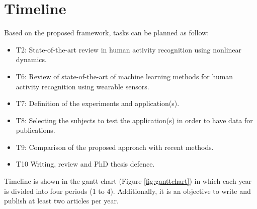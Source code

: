 
\chapter{Timeline}

\ifpdf
    \graphicspath{{Chapter4/Figs/Raster/}{Chapter4/Figs/PDF/}{Chapter4/Figs/}}
\else
    \graphicspath{{Chapter4/Figs/Vector/}{Chapter4/Figs/}}
\fi

Based on the proposed framework, tasks can be planned as follow:
\begin{itemize}[noitemsep,topsep=0pt,parsep=0pt,partopsep=0pt]
 \item T2: State-of-the-art review in human activity recognition using 
 nonlinear dynamics.
\item T6: Review of state-of-the-art of machine learning methods 
for human activity recognition using wearable sensors.
\item T7: Definition of the experiments and application(s).
\item T8: Selecting the subjects to test the application(s) in order to have 
data for publications.
\item T9: Comparison of the proposed approach with recent methods.
\item T10 Writing, review and PhD thesis defence.
\end{itemize}

Timeline is shown in the gantt chart (Figure \ref{fig:ganttchart})
in which each year is divided into four periods (1 to 4).
Additionally, it is an objective to write and publish at least two articles per year.


